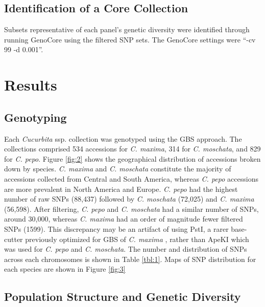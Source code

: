 \documentclass[utf8]{FrontiersinHarvard} %
\begin{document}
\subsection{Identification of a Core Collection}
Subsets representative of each panel’s genetic diversity were identified through running GenoCore \citep{Jeong2017} using the filtered SNP sets. The GenoCore settings were “-cv 99 -d 0.001”.


\section{Results}

\subsection{Genotyping}
Each \textit{Cucurbita} ssp. collection was genotyped using the GBS approach. The collections comprised 534 accessions for \textit{C. maxima}, 314 for \textit{C. moschata}, and 829 for \textit{C. pepo}. Figure \ref{fig:2} shows the geographical distribution of accessions broken down by species. \textit{C. maxima} and \textit{C. moschata} constitute the majority of accessions collected from Central and South America, whereas \textit{C. pepo} accessions are more prevalent in North America and Europe. \textit{C. pepo} had the highest number of raw SNPs (88,437) followed by \textit{C. moschata} (72,025) and \textit{C. maxima} (56,598). After filtering, \textit{C. pepo} and \textit{C. moschata} had a similar number of SNPs, around 30,000, whereas \textit{C. maxima} had an order of magnitude fewer filtered SNPs (1599). This discrepancy may be an artifact of using PstI, a rarer base-cutter previously optimized for GBS of \textit{C. maxima} \citep{Zhang2015} , rather than ApeKI which was used for \textit{C. pepo} and \textit{C. moschata}. The number and distribution of SNPs across each chromosomes is shown in Table \ref{tbl:1}. Maps of SNP distribution for each species are shown in Figure \ref{fig:3}

\subsection{Population Structure and Genetic Diversity}
\end{document}
